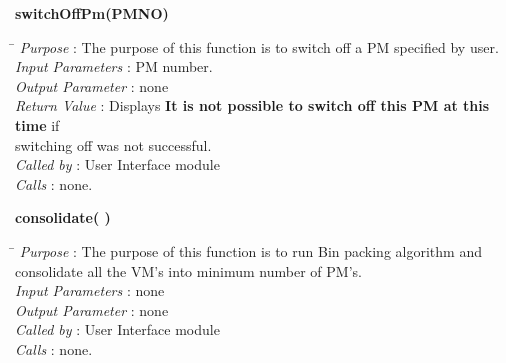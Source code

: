 \documentclass[a4paper,11pt]{article}
\begin{document}
\begin{itemize}
\textbf{switchOffPm(PM\textunderscore NO)}
  
\begin{tabbing}
\hspace*{4cm}\=  \kill
 \textit{Purpose} \> : The purpose of this function is to switch off a PM specified by user.\\
  \textit{Input Parameters} \> : PM number. \\
  \textit{Output Parameter} \> : none \\
  \textit{Return Value} \> : Displays \textbf{It is not possible to switch off this PM at this time} if \\ \>switching off was not successful. \\
  \textit{Called by} \> : User Interface module \\
  \textit{Calls} \> : none.
\end{tabbing}

\textbf{consolidate( )}
  
\begin{tabbing}
\hspace*{4cm}\=  \kill
 \textit{Purpose} \> : The purpose of this function is to run Bin packing algorithm and \\ \> consolidate all the VM's into minimum number of PM's.\\
  \textit{Input Parameters} \> : none \\
  \textit{Output Parameter} \> : none \\
    \textit{Called by} \> : User Interface module \\
  \textit{Calls} \> : none.
\end{tabbing}
\end{itemize}
\end{document}

